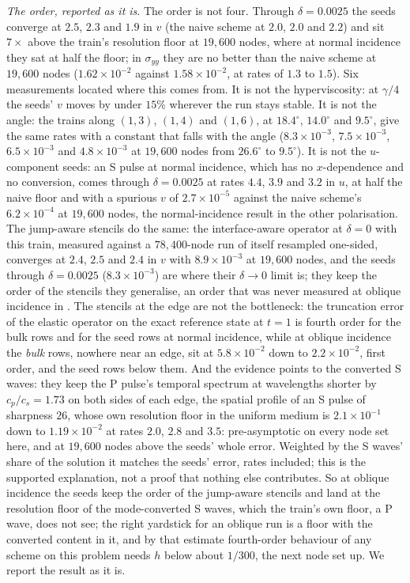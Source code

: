 \documentclass[11pt]{amsart}
\theoremstyle{definition}
\theoremstyle{remark}
\newcommand{\para}[1]{\par\smallskip\noindent\textit{#1}.\enspace}
\begin{document}
\para{The order, reported as it is}
The order is not four. Through $\delta = 0.0025$ the seeds converge at
$2.5$, $2.3$ and $1.9$ in $v$ (the naive scheme at $2.0$, $2.0$ and $2.2$)
and sit $7\times$ above the train's resolution floor at $19{,}600$
nodes, where at normal incidence they sat at half the floor; in
$\sigma_{yy}$ they are no better than the naive scheme at $19{,}600$
nodes ($1.62 \times 10^{-2}$ against $1.58 \times 10^{-2}$, at rates of
$1.3$ to $1.5$). Six measurements located where this comes from. It is
not the hyperviscosity: at $\gamma / 4$ the seeds' $v$ moves by under
$15\%$ wherever the run stays stable. It is not the angle: the trains
along $(1, 3)$, $(1, 4)$ and $(1, 6)$, at $18.4^\circ$, $14.0^\circ$ and
$9.5^\circ$, give the same rates with a constant that falls with the
angle ($8.3 \times 10^{-3}$, $7.5 \times 10^{-3}$, $6.5 \times 10^{-3}$
and $4.8 \times 10^{-3}$ at $19{,}600$ nodes from $26.6^\circ$ to
$9.5^\circ$). It is not the $u$-component seeds: an S pulse at normal
incidence, which has no $x$-dependence and no conversion, comes through
$\delta = 0.0025$ at rates $4.4$, $3.9$ and $3.2$ in $u$, at half the
naive floor and with a spurious $v$ of $2.7 \times 10^{-5}$ against the
naive scheme's $6.2 \times 10^{-4}$ at $19{,}600$ nodes, the
normal-incidence result in the other polarisation. The jump-aware
stencils do the same: the interface-aware operator at $\delta = 0$ with
this train, measured against a $78{,}400$-node run of itself resampled
one-sided, converges at $2.4$, $2.5$ and $2.4$ in $v$ with
$8.9 \times 10^{-3}$ at $19{,}600$ nodes, and the seeds through
$\delta = 0.0025$ ($8.3 \times 10^{-3}$) are where their $\delta \to 0$
limit is; they keep the order of the stencils they generalise, an order
that was never measured at oblique incidence in
\cite{Martin2016,MartinFornberg2017}. The stencils at the edge are not
the bottleneck: the truncation error of the elastic operator on the
exact reference state at $t = 1$ is fourth order for the bulk rows and
for the seed rows at normal incidence, while at oblique incidence the
\emph{bulk} rows, nowhere near an edge, sit at $5.8 \times 10^{-2}$ down
to $2.2 \times 10^{-2}$, first order, and the seed rows below them. And
the evidence points to the converted S waves: they keep the P pulse's temporal spectrum
at wavelengths shorter by $c_p / c_s = 1.73$ on both sides of each edge,
the spatial profile of an S pulse of sharpness $26$, whose own
resolution floor in the uniform medium is $2.1 \times 10^{-1}$ down to
$1.19 \times 10^{-2}$ at rates $2.0$, $2.8$ and $3.5$: pre-asymptotic on
every node set here, and at $19{,}600$ nodes above the seeds' whole
error. Weighted by the S waves' share of the solution it matches the seeds'
error, rates included; this is the supported explanation, not a proof
that nothing else contributes. So at oblique incidence the seeds keep the order
of the jump-aware stencils and land at the resolution floor of the
mode-converted S waves, which the train's own floor, a P wave, does not
see; the right yardstick for an oblique run is a floor with the
converted content in it, and by that estimate fourth-order behaviour of any scheme on this problem
needs $h$ below about $1 / 300$, the next node set up. We report the
result as it is.
\end{document}
